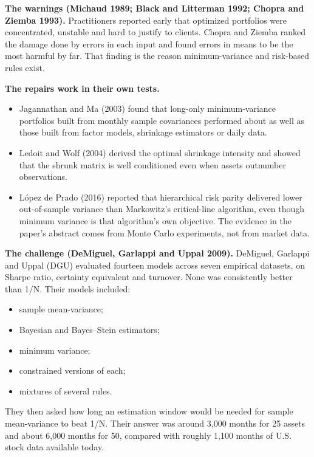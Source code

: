 \textbf{The warnings (Michaud 1989; Black and Litterman 1992; Chopra and Ziemba 1993).} Practitioners reported early that optimized portfolios were concentrated, unstable and hard to justify to clients. Chopra and Ziemba ranked the damage done by errors in each input and found errors in means to be the most harmful by far. That finding is the reason minimum-variance and risk-based rules exist.

\textbf{The repairs work in their own tests.}

\begin{itemize}
  \item Jagannathan and Ma (2003) found that long-only minimum-variance portfolios built from monthly sample covariances performed about as well as those built from factor models, shrinkage estimators or daily data.
  \item Ledoit and Wolf (2004) derived the optimal shrinkage intensity and showed that the shrunk matrix is well conditioned even when assets outnumber observations.
  \item L\'opez de Prado (2016) reported that hierarchical risk parity delivered lower out-of-sample variance than Markowitz's critical-line algorithm, even though minimum variance is that algorithm's own objective. The evidence in the paper's abstract comes from Monte Carlo experiments, not from market data.
\end{itemize}

\textbf{The challenge (DeMiguel, Garlappi and Uppal 2009).} DeMiguel, Garlappi and Uppal (DGU) evaluated fourteen models across seven empirical datasets, on Sharpe ratio, certainty equivalent and turnover. None was consistently better than 1/N. Their models included:

\begin{itemize}
  \item sample mean-variance;
  \item Bayesian and Bayes--Stein estimators;
  \item minimum variance;
  \item constrained versions of each;
  \item mixtures of several rules.
\end{itemize}

They then asked how long an estimation window would be needed for sample mean-variance to beat 1/N. Their answer was around 3,000 months for 25 assets and about 6,000 months for 50, compared with roughly 1,100 months of U.S. stock data available today.

